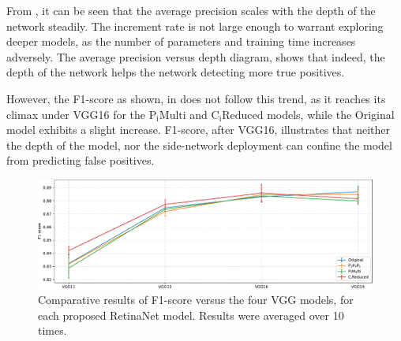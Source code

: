 From , it can be seen that the average precision scales with the depth of the network steadily. The increment rate is not large enough  to warrant exploring deeper models, as the number of parameters and training time increases adversely. The average precision versus depth diagram, shows that indeed, the depth of the network helps the network detecting more true positives. 

However, the F1-score as shown, in  does not follow this trend, as it reaches its climax under VGG16 for the $\text{P}_\text{i}\text{Multi}$ and $\text{C}_\text{i}\text{Reduced}$ models, while the Original model exhibits a slight increase.
F1-score, after VGG16, illustrates that neither the depth of the model, nor the side-network deployment can confine the model from predicting false positives.

\begin{figure}[!htb]
  \centering
  \includegraphics[width=\textwidth]{figures/ch4/fig2.pdf}
  \caption{Comparative results of F1-score versus the four VGG models, for each proposed RetinaNet model. Results were averaged over 10 times.}
  \label{fig2}
\end{figure}

\begin{table}[!htb]
  \centering
  \caption{Indicative values of F1-score for the selected four VGG models, for each proposed RetinaNet model (). Parentheses indicate the input resolution.}
  \label{tab2}
\end{table}

